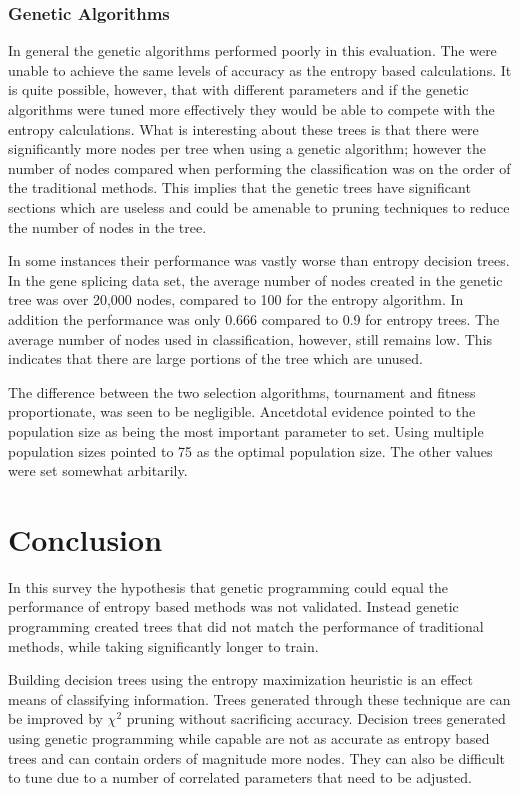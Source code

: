 \documentclass[12pt,letterpaper]{article}
\begin{document}
\subsubsection*{Genetic Algorithms}
In general the genetic algorithms performed poorly in this evaluation. The were unable to achieve the same levels of accuracy as the entropy based calculations. It is quite possible, however, that with different parameters and if the genetic algorithms were tuned more effectively they would be able to compete with the entropy calculations. What is interesting about these trees is that there were significantly more nodes per tree when using a genetic algorithm; however the number of nodes compared when performing the classification was on the order of the traditional methods. This implies that the genetic trees have significant sections which are useless and could be amenable to pruning techniques to reduce the number of nodes in the tree. 

In some instances their performance was vastly worse than entropy decision trees. In the gene splicing data set, the average number of nodes created in the genetic tree was over 20,000 nodes, compared to 100 for the entropy algorithm. In addition the performance was only 0.666 compared to 0.9 for entropy trees. The average number of nodes used in classification, however, still remains low. This indicates that there are large portions of the tree which are unused. 

The difference between the two selection algorithms, tournament and fitness proportionate, was seen to be negligible. Ancetdotal evidence pointed to the population size as being the most important parameter to set. Using multiple population sizes pointed to 75 as the optimal population size. The other values were set somewhat arbitarily. 



\section{Conclusion}
In this survey the hypothesis that genetic programming could equal the performance of entropy based methods was not validated. Instead genetic programming created trees that did not match the performance of traditional methods, while taking significantly longer to train. 

Building decision trees using the entropy maximization heuristic is an effect means of classifying information. Trees generated through these technique are can be improved by $\chi^{2}$ pruning without sacrificing accuracy. Decision trees generated using genetic programming while capable are not as accurate as entropy based trees and can contain orders of magnitude more nodes. They can also be difficult to tune due to a number of correlated parameters that need to be adjusted. 




\end{document}
